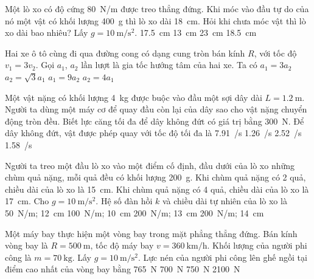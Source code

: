 \begin{ex}
	Một lò xo có độ cứng \SI{80}{\newton/\meter} được treo thẳng đứng. Khi móc vào đầu tự do của nó một vật có khối lượng \SI{400}{\gram} thì lò xo dài \SI{18}{\centi\meter}. Hỏi khi chưa móc vật thì lò xo dài bao nhiêu? Lấy $g=\SI{10}{\meter/\second^2}$.
	\choice
	{\SI{17.5}{\centi\meter}}
	{\SI{13}{\centi\meter}}
	{\SI{23}{\centi\meter}}
	{\SI{18.5}{\centi\meter}}
	\loigiai{}
\end{ex}
\begin{ex}
	Hai xe ô tô cùng đi qua đường cong có dạng cung tròn bán kính $R$, với tốc độ $v_1=3v_2$. Gọi $a_1$, $a_2$ lần lượt là gia tốc hướng tâm của hai xe. Ta có
	\choice
	{$a_1=3a_2$}
	{$a_2=\sqrt{3}a_1$}
	{$a_1=9a_2$}
	{$a_2=4a_1$}
	\loigiai{}
\end{ex}
\begin{ex}
	Một vật nặng có khối lượng \SI{4}{\kilogram} được buộc vào đầu một sợi dây dài $L=\SI{1.2}{\meter}$. Người ta dùng một máy cơ để quay đầu còn lại của dây sao cho vật nặng chuyển động tròn đều. Biết lực căng tối đa để dây không đứt có giá trị bằng \SI{300}{\newton}. Để dây không đứt, vật được phép quay với tốc độ tối đa là
	\choice
	{\SI{7.91}{/\second}}
	{\True \SI{1.26}{/\second}}
	{\SI{2.52}{/\second}}
	{\SI{1.58}{/\second}}
	\loigiai{}
\end{ex}
\begin{ex}
	Người ta treo một đầu lò xo vào một điểm cố định, đầu dưới của lò xo những chùm quả nặng, mỗi quả đều có khối lượng \SI{200}{\gram}. Khi chùm quả nặng có 2 quả, chiều dài của lò xo là \SI{15}{\centi\meter}. Khi chùm quả nặng có 4 quả, chiều dài của lò xo là \SI{17}{\centi\meter}. Cho $g=\SI{10}{\meter/\second^2}$. Hệ số đàn hồi $k$ và chiều dài tự nhiên của lò xo là
	\choice
	{\SI{50}{\newton/\meter}; \SI{12}{\centi\meter}}
	{\SI{100}{\newton/\meter}; \SI{10}{\centi\meter}}
	{\SI{200}{\newton/\meter}; \SI{13}{\centi\meter}}
	{\SI{200}{\newton/\meter}; \SI{14}{\centi\meter}}
	\loigiai{}
\end{ex}
\begin{ex}
	Một máy bay thực hiện một vòng bay trong mặt phẳng thẳng đứng. Bán kính vòng bay là $R=\SI{500}{\meter}$, tốc độ máy bay $v=\SI{360}{\kilo\meter/\hour}$. Khối lượng của người phi công là $m=\SI{70}{\kilogram}$. Lấy $g=\SI{10}{\meter/\second^2}$. Lực nén của người phi công lên ghế ngồi tại điểm cao nhất của vòng bay bằng
	\choice
	{\SI{765}{\newton}}
	{\SI{700}{\newton}}
	{\SI{750}{\newton}}
	{\SI{2100}{\newton}}
	\loigiai{}
\end{ex}
